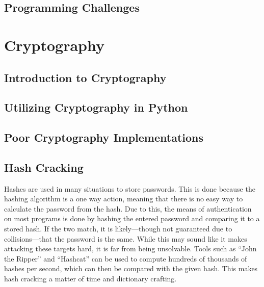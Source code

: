 \documentclass[a4paper,11pt]{report}
\begin{document}
	\section{Programming Challenges}
\chapter{Cryptography}
	\label{ch:Cryptography}
	\section{Introduction to Cryptography}
	\section{Utilizing Cryptography in Python}
	\section{Poor Cryptography Implementations}
	\section{Hash Cracking}
		Hashes are used in many situations to store passwords. 
		This is done because the hashing algorithm is a one way action, meaning that there is no easy way to calculate the password from the hash. 
		Due to this, the means of authentication on most programs is done by hashing the entered password and comparing it to a stored hash. 
		If the two match, it is likely---though not guaranteed due to collisions---that the password is the same. 
		While this may sound like it makes attacking these targets hard, it is far from being unsolvable. 
		Tools such as ``John the Ripper'' and ``Hashcat'' can be used to compute hundreds of thousands of hashes per second, which can then be compared with the given hash. 
		This makes hash cracking a matter of time and dictionary crafting. 
\end{document}

